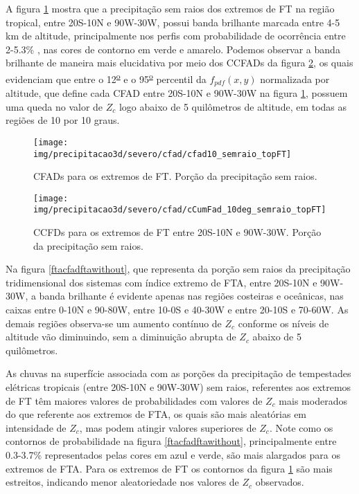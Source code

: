 A figura \ref{ftcfadftawithout} mostra que a precipitação sem raios dos extremos de FT na região tropical, entre 20S-10N e 90W-30W, possui banda brilhante marcada entre 4-5 km de altitude, principalmente nos perfis com probabilidade de ocorrência entre 2-5.3\%  , nas cores de contorno em verde e amarelo. Podemos observar a banda brilhante de maneira mais elucidativa por meio dos CCFADs da figura \ref{ftccfadftawithout}, os quais evidenciam que entre o 12\textsuperscript{\underline{o}} e o 95\textsuperscript{\underline{o}} percentil da $f_{pdf}(x,y)$ normalizada por altitude, que define cada CFAD entre 20S-10N e 90W-30W na figura \ref{ftcfadftawithout}, possuem uma queda no valor de $Z_c$ logo abaixo de 5 quilômetros de altitude, em todas as regiões de 10 por 10 graus. 

\begin{figure}[!ht]
  \centering
  \texttt{[image: img/precipitacao3d/severo/cfad/cfad10\_semraio\_topFT]}
 \caption{CFADs para os extremos de FT. Porção da precipitação sem raios.}
 \label{ftcfadftawithout}
\end{figure} 

\begin{figure}[!ht]
  \centering
   {\texttt{[image: img/precipitacao3d/severo/cfad/cCumFad\_10deg\_semraio\_topFT]}}
 \caption{CCFDs para os extremos de FT entre 20S-10N e 90W-30W. Porção da precipitação sem raios.}
 \label{ftccfadftawithout}
\end{figure} 

Na figura \ref{ftacfadftawithout}, que representa da porção sem raios da precipitação tridimensional dos sistemas com índice extremo de FTA, entre 20S-10N e 90W-30W, a banda brilhante é evidente apenas nas regiões costeiras e oceânicas, nas caixas entre 0-10N  e 90-80W, entre 10-0S e 40-30W e entre 20-10S e 70-60W. As demais regiões observa-se um aumento contínuo de $Z_c$ conforme os níveis de altitude vão diminuindo, sem a diminuição abrupta de $Z_c$ abaixo de 5 quilômetros.    

As chuvas na superfície associada com as porções da precipitação de tempestades elétricas tropicais (entre 20S-10N e 90W-30W) sem raios, referentes aos extremos de FT têm maiores valores de probabilidades com valores de $Z_c$ mais moderados do que referente aos extremos de FTA, os quais são mais aleatórias em intensidade de $Z_c$, mas podem atingir valores superiores de $Z_c$. Note como os contornos de probabilidade na figura \ref{ftacfadftawithout}, principalmente entre 0.3-3.7\% representados pelas cores em azul e verde, são mais alargados para os extremos de FTA. Para os extremos de FT os contornos da figura \ref{ftcfadftawithout} são mais estreitos, indicando menor aleatoriedade nos valores de $Z_c$ observados.

